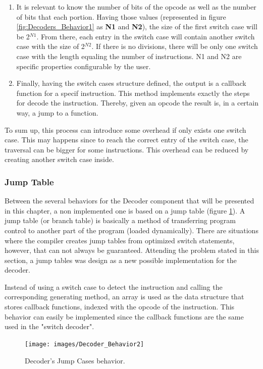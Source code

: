 \documentclass[12pt]{article}
\begin{document}
{\begin{enumerate}
        \item It is relevant to know the number of bits of the opcode as well as the number of bits that each portion. Having those values (represented in figure \ref{fig:Decoders_Behavior1} as \textbf{N1} and \textbf{N2}), the size of the first switch case will be 2$^{N1}$. From there, each entry in the switch case will contain another switch case with the size of 2$^{N2}$. If there is no divisions, there will be only one switch case with the length equaling the number of instructions. N1 and N2 are specific properties configurable by the user.

		\item Finally, having the switch cases structure defined, the output is a callback function for a specif instruction. This method implements exactly the steps for decode the instruction. Thereby, given an opcode the result is, in a certain way, a jump to a function.
	\end{enumerate}
    
    To sum up, this process can introduce some overhead if only exists one switch case. This may happens since to reach the correct entry of the switch case, the traversal can be bigger for some instructions. This overhead can be reduced by creating another switch case inside. 

   
\subsubsection{Jump Table}

Between the several behaviors for the Decoder component that will be presented in this chapter, a non implemented one is based on a jump table (figure \ref{fig:Decoders_Behavior2}). A jump table (or branch table) is basically a method of transferring program control to another part of the program (loaded dynamically). There are situations where the compiler creates jump tables from optimized switch statements, however, that can not always be guaranteed. Attending the problem stated in this section, a jump tables was design as a new possible implementation for the decoder. 

Instead of using a switch case to detect the instruction and calling the corresponding generating method, an array is used as the data structure that stores callback functions, indexed with the opcode of the instruction. This behavior can easily be implemented since the callback functions are the same used in the "switch decoder". 

\begin{figure}[
H]
\centerline{
\texttt{[image: images/Decoder\_Behavior2]}
}
\caption{Decoder's Jump Cases behavior.}
\label{fig:Decoders_Behavior2} 
\end{figure}


}
\end{document}
